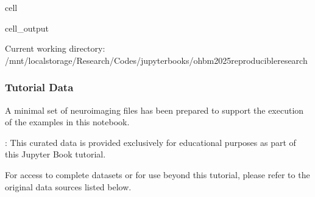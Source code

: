 \documentclass[letterpaper,10pt,english]{jupyterBook}
\begin{document}
\begin{sphinxuseclass}{cell}
\begin{sphinxVerbatimOutput}
\begin{sphinxuseclass}{cell_output}
\begin{sphinxVerbatim}[commandchars=\\\{\}]
Current working directory: /mnt/local\PYGZus{}storage/Research/Codes/jupyterbooks/ohbm2025\PYGZhy{}reproducible\PYGZhy{}research
\end{sphinxVerbatim}

\end{sphinxuseclass}\end{sphinxVerbatimOutput}

\end{sphinxuseclass}

\subsubsection{Tutorial Data}
\label{\detokenize{chapters/03/03c_visualization-examples:tutorial-data}}
\sphinxAtStartPar
A minimal set of neuroimaging files has been prepared to support the execution of the examples in this notebook.

\sphinxAtStartPar
{}: This curated data is provided exclusively for educational purposes as part of this Jupyter Book tutorial.

\sphinxAtStartPar
For access to complete datasets or for use beyond this tutorial, please refer to the original data sources listed below.
\end{document}
